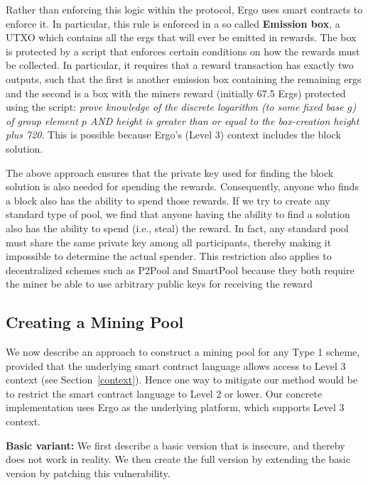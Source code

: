 \documentclass[11pt]{article}
\newcommand{\authnote}[2]{\marginpar{\parbox{\marginparwidth}{\tiny %
  \textsf{#1 {\textcolor{blue}{notes: #2}}}}}%
  \textcolor{blue}{\textbf{\dag}}}
\newcommand{\authnote}[2]{
  \textsf{#1 \textcolor{blue}{: #2}}}
\newcommand{\authnote}[2]{}
\newcommand{\snote}[1]{{\authnote{\textcolor{red}{Scalahub notes}}{#1}}}
\begin{document}
\snote{Maybe make this section less Ergo-specific}

Rather than enforcing this logic within the protocol, Ergo uses smart contracts to enforce it. In particular, this rule is enforced in a so called \textbf{Emission box}, a UTXO which contains all the ergs that will ever be emitted in rewards. The box is protected by a script that enforces certain conditions on how the rewards must be collected. In particular, it requires that a reward transaction has exactly two outputs, such that the first is another emission box containing the remaining ergs and the second is a box with the miners reward (initially 67.5 Ergs) protected using the script: {\em prove knowledge of the discrete logarithm (to some fixed base $g$) of group element $p$ AND height is greater than or equal to the box-creation height plus 720}.
This is possible because Ergo's (Level 3) context includes the block solution.  

The above approach ensures that the private key used for finding the block solution is also needed for spending the rewards. Consequently, anyone who finds a block also has the ability to spend those rewards. 
If we try to create any standard type of pool, we find that anyone having the ability to find a solution also has the ability to spend (i.e., steal) the reward. In fact, any standard pool must share the same private key among all participants, thereby making it impossible to determine the actual spender. This restriction also applies to decentralized schemes such as P2Pool and SmartPool because they both require the miner be able to use arbitrary public keys for receiving the reward

\subsection{Creating a Mining Pool}

We now describe an approach to construct a mining pool for any Type 1 scheme, provided that the underlying smart contract language allows access to Level 3 context (see Section~\ref{context}). Hence one way to mitigate our method would be to restrict the smart contract language to Level 2 or lower. Our concrete implementation uses Ergo as the underlying platform, which supports Level 3 context.

\textbf{Basic variant:} We first describe a basic version that is insecure, and thereby does not work in reality. We then create the full version by extending the basic version by patching this vulnerability.
\end{document}
